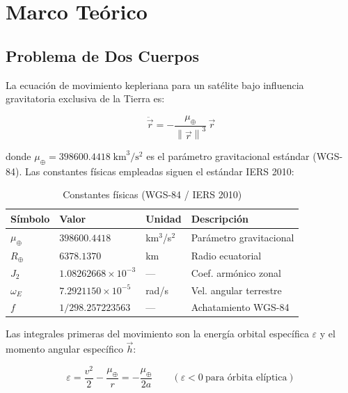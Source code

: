 \documentclass[12pt,a4paper]{article}
\newcommand{\RE}{R_{\oplus}}
\newcommand{\muE}{\mu_{\oplus}}
\newcommand{\norm}[1]{\left\|#1\right\|}
\begin{document}
\section{Marco Te\'orico}

\subsection{Problema de Dos Cuerpos}

La ecuaci\'on de movimiento kepleriana para un sat\'elite bajo influencia gravitatoria exclusiva de la Tierra es:

\begin{equation}
  \ddot{\vec{r}} = -\frac{\muE}{\norm{\vec{r}}^3}\,\vec{r}
  \label{eq:twobody}
\end{equation}

donde $\muE = 398600.4418\;\text{km}^3/\text{s}^2$ es el par\'ametro gravitacional est\'andar (WGS-84). Las constantes f\'isicas empleadas siguen el est\'andar IERS 2010:

\begin{table}[H]
\centering
\caption{Constantes f\'isicas (WGS-84 / IERS 2010)}
\label{tab:constants}
\begin{tabular}{llll}
\toprule
\textbf{S\'imbolo} & \textbf{Valor} & \textbf{Unidad} & \textbf{Descripci\'on} \\
\midrule
$\muE$     & $398600.4418$            & km$^3$/s$^2$ & Par\'ametro gravitacional \\
$\RE$      & $6378.1370$              & km           & Radio ecuatorial \\
$J_2$      & $1.08262668\times10^{-3}$ & ---         & Coef. arm\'onico zonal \\
$\omega_E$ & $7.2921150\times10^{-5}$ & rad/s        & Vel. angular terrestre \\
$f$        & $1/298.257223563$        & ---          & Achatamiento WGS-84 \\
\bottomrule
\end{tabular}
\end{table}

Las integrales primeras del movimiento son la energ\'ia orbital espec\'ifica $\varepsilon$ y el momento angular espec\'ifico $\vec{h}$:

\begin{equation}
  \varepsilon = \frac{v^2}{2} - \frac{\muE}{r} = -\frac{\muE}{2a}
  \qquad (\varepsilon < 0\ \text{para \'orbita el\'iptica})
\end{equation}
\end{document}
